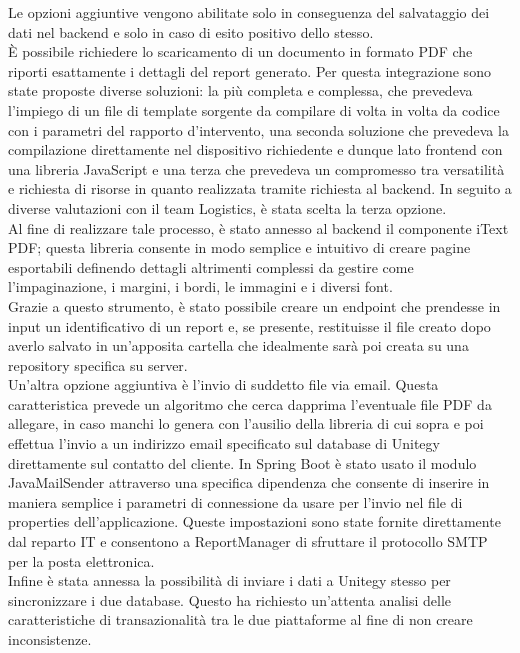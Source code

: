 Le opzioni aggiuntive vengono abilitate solo in conseguenza del salvataggio dei dati nel backend e solo in caso di esito positivo dello stesso.
\\
È possibile richiedere lo scaricamento di un documento in formato PDF che riporti esattamente i dettagli del report generato.
Per questa integrazione sono state proposte diverse soluzioni: la più completa e complessa, che prevedeva l'impiego di un file di template sorgente da compilare di volta in volta
da codice con i parametri del rapporto d'intervento, una seconda soluzione che prevedeva la compilazione direttamente nel dispositivo richiedente e dunque lato frontend con una
libreria JavaScript e una terza che prevedeva un compromesso tra versatilità e richiesta di risorse in quanto realizzata tramite richiesta al backend.
In seguito a diverse valutazioni con il team Logistics, è stata scelta la terza opzione.
\\
Al fine di realizzare tale processo, è stato annesso al backend il componente iText PDF; questa libreria consente in modo semplice e intuitivo di creare pagine esportabili
definendo dettagli altrimenti complessi da gestire come l'impaginazione, i margini, i bordi, le immagini e i diversi font.
\\
Grazie a questo strumento, è stato possibile creare un endpoint che prendesse in input un identificativo di un report e, se presente, restituisse il file creato dopo averlo salvato
in un'apposita cartella che idealmente sarà poi creata su una repository specifica su server.
\\
Un'altra opzione aggiuntiva è l'invio di suddetto file via email.
Questa caratteristica prevede un algoritmo che cerca dapprima l'eventuale file PDF da allegare, in caso manchi lo genera con l'ausilio della libreria di cui sopra e
poi effettua l'invio a un indirizzo email specificato sul database di Unitegy direttamente sul contatto del cliente.
In Spring Boot è stato usato il modulo JavaMailSender attraverso una specifica dipendenza che consente di inserire in maniera semplice i parametri di connessione da
usare per l'invio nel file di properties dell'applicazione.
Queste impostazioni sono state fornite direttamente dal reparto IT e consentono a ReportManager di sfruttare il protocollo SMTP per la posta elettronica.
\\
Infine è stata annessa la possibilità di inviare i dati a Unitegy stesso per sincronizzare i due database.
Questo ha richiesto un'attenta analisi delle caratteristiche di transazionalità tra le due piattaforme al fine di non creare inconsistenze.
